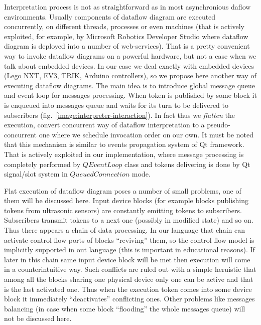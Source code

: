 \documentclass[conference,compsoc]{IEEEtran}
\begin{document}
Interpretation process is not as straightforward as in most asynchronious daflow environments. Usually components of dataflow diagram are executed concurrently, on different threads, processes or even machines (that is actively exploited, for example, by Microsoft Robotics Developer Studio where dataflow diagram is deployed into a number of web-services). That is a pretty convenient way to invoke dataflow diagrams on a powerful hardware, but not a case when we talk about embedded devices. In our case we deal exactly with embedded devices (Lego NXT, EV3, TRIK, Arduino controllers), so we propose here another way of executing dataflow diagrams. The main idea is to introduce global message queue and event loop for messages processing. When token is published by some block it is enqueued into messages queue and waits for its turn to be delivered to subscribers (fig.~\ref{image:interpreter-interaction}). In fact thus we \textit{flatten} the execution, convert concurrent way of dataflow interpretation to a pseudo-concurrent one where we schedule invocation order on our own. It must be noted that this mechanism is similar to events propagation system of Qt framework. That is actively exploited in our implementation, where message processing is completely performed by $QEventLoop$ class and tokens delivering is done by Qt signal/slot system in $QueuedConnection$ mode. 

Flat execution of dataflow diagram poses a number of small problems, one of them will be discussed here. Input device blocks (for example blocks publishing tokens from ultrasonic sensors) are constantly emitting tokens to subscribers. Subscribers transmit tokens to a next one (possibly in modified state) and so on. Thus there appears a chain of data processing. In our language that chain can activate control flow ports of blocks ``reviving'' them, so the control flow model is implicitly supported in out language (this is important in educational reasons). If later in this chain same input device block will be met then execution will come in a 
counterintuitive way. Such conflicts are ruled out with a simple heruistic that among all the blocks sharing one physical device only one can be active and that is the last activated one. Thus when the execution token comes into some device block it immediately ``deactivates'' conflicting ones. Other problems like messages balancing (in case when some block ``flooding'' the whole messages queue) will not be discussed here.
\end{document}
